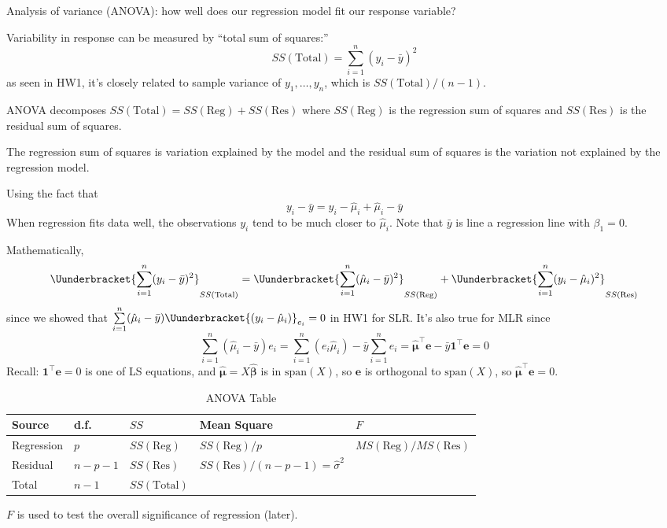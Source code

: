 Analysis of variance (ANOVA): how well
does our regression model fit our
response variable?

Variability in response can be measured by
``total sum of squares:''
\[ SS(\text{Total}) =
    \sum\limits_{i=1}^{n} (y_i-\bar{y})^2 \]
as seen in HW1, it's closely related to
sample variance of $ y_1,\ldots,y_n $,
which is $ SS(\text{Total})/(n-1) $.

ANOVA decomposes $ SS(\text{Total})=SS(\text{Reg})+SS(\text{Res}) $
where $ SS(\text{Reg}) $ is the regression sum of squares
and $ SS(\text{Res}) $ is the residual sum of squares.

The regression sum of squares is variation explained by
the model
and the residual sum of squares is the variation not
explained by the regression model.

Using the fact that
\[ y_i-\bar{y}=y_i-\hat{\mu}_i+\hat{\mu}_i-\bar{y} \]
When regression fits data well,
the observations $ y_i $ tend to be much closer to $ \hat{\mu}_i $.
Note that $ \bar{y} $ is line a regression line with $ \beta_1=0 $.

Mathematically,
\[ \Uunderbracket{\sum\limits_{i=1}^{n} (y_i-\bar{y})^2}_{SS(\text{Total})}
    =\Uunderbracket{\sum\limits_{i=1}^{n} (\hat{\mu}_i-\bar{y})^2}_{SS(\text{Reg})}+
    \Uunderbracket{\sum\limits_{i=1}^{n} (y_i-\hat{\mu}_i)^2}_{SS(\text{Res})} \]
since we showed that $ \sum\limits_{i=1}^{n}(\hat{\mu}_i-\bar{y})
    \Uunderbracket{(y_i-\hat{\mu}_i)}_{e_i}=0 $ in HW1 for SLR\@.
It's also true for MLR since
\[ \sum\limits_{i=1}^{n} (\hat{\mu}_i-\bar{y})e_i=
    \sum\limits_{i=1}^{n} (e_i\hat{\mu}_i)-\bar{y}\sum\limits_{i=1}^{n} e_i
    =\hat{\symbf{\mu}}^\top\symbf{e}-\bar{y}\symbf{1}^\top\symbf{e}=0 \]
Recall: $ \symbf{1}^\top\symbf{e}=0 $ is one of LS equations,
and $ \hat{\symbf{\mu}}=X\hat{\symbf{\beta}} $ is in $ \text{span}(X) $,
so $ \symbf{e} $ is orthogonal to $ \text{span}(X) $,
so $ \hat{\symbf{\mu}}^\top\symbf{e}=0 $.

\begin{table}[H]
    \centering
    \caption{ANOVA Table}
    \begin{tabu} to 1\textwidth {Y[0.5]YYY[2]Y}
        \toprule
        Source     & d.f.      & $ SS $               & Mean Square                               & $ F $                             \\
        \midrule
        Regression & $ p $     & $ SS(\text{Reg}) $   & $ SS(\text{Reg})/p $                      & $ MS(\text{Reg})/MS(\text{Res}) $ \\
        Residual   & $ n-p-1 $ & $ SS(\text{Res}) $   & $ SS(\text{Res})/(n-p-1)=\hat{\sigma}^2 $                                     \\
        \midrule
        Total      & $ n-1 $   & $ SS(\text{Total}) $                                                                                 \\
        \bottomrule
    \end{tabu}
\end{table}
$ F $ is used to test the overall significance of regression (later).

